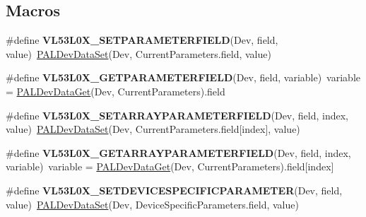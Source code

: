 \subsection*{Macros}
\begin{DoxyCompactItemize}
\item 
\mbox{\label{group__VL53L0X__define__GeneralMacro__group_gaf05e77eb0d359a32ee6c83172b3da513}} 
\#define {\bfseries V\+L53\+L0\+X\+\_\+\+S\+E\+T\+P\+A\+R\+A\+M\+E\+T\+E\+R\+F\+I\+E\+LD}(Dev,  field,  value)~\hyperlink{group__VL53L0X__platform__group_ga7d67a50d6fbce3ffdb71b4b3f7cbdf39}{P\+A\+L\+Dev\+Data\+Set}(Dev, Current\+Parameters.\+field, value)
\item 
\mbox{\label{group__VL53L0X__define__GeneralMacro__group_ga9b7d953c2ac75a493a51d9e19ab7a33f}} 
\#define {\bfseries V\+L53\+L0\+X\+\_\+\+G\+E\+T\+P\+A\+R\+A\+M\+E\+T\+E\+R\+F\+I\+E\+LD}(Dev,  field,  variable)~variable = \hyperlink{group__VL53L0X__platform__group_ga21f3ef1fbe84f5cf77d989c95f21ad0a}{P\+A\+L\+Dev\+Data\+Get}(Dev, Current\+Parameters).field
\item 
\mbox{\label{group__VL53L0X__define__GeneralMacro__group_ga47598a8e8857a13e300f585ea0106892}} 
\#define {\bfseries V\+L53\+L0\+X\+\_\+\+S\+E\+T\+A\+R\+R\+A\+Y\+P\+A\+R\+A\+M\+E\+T\+E\+R\+F\+I\+E\+LD}(Dev,  field,  index,  value)~\hyperlink{group__VL53L0X__platform__group_ga7d67a50d6fbce3ffdb71b4b3f7cbdf39}{P\+A\+L\+Dev\+Data\+Set}(Dev, Current\+Parameters.\+field\mbox{[}index\mbox{]}, value)
\item 
\mbox{\label{group__VL53L0X__define__GeneralMacro__group_gaabf50682bc638f1b109333cedbab6bbf}} 
\#define {\bfseries V\+L53\+L0\+X\+\_\+\+G\+E\+T\+A\+R\+R\+A\+Y\+P\+A\+R\+A\+M\+E\+T\+E\+R\+F\+I\+E\+LD}(Dev,  field,  index,  variable)~variable = \hyperlink{group__VL53L0X__platform__group_ga21f3ef1fbe84f5cf77d989c95f21ad0a}{P\+A\+L\+Dev\+Data\+Get}(Dev, Current\+Parameters).field\mbox{[}index\mbox{]}
\item 
\mbox{\label{group__VL53L0X__define__GeneralMacro__group_gaf99327f12679ada115435e413110eb10}} 
\#define {\bfseries V\+L53\+L0\+X\+\_\+\+S\+E\+T\+D\+E\+V\+I\+C\+E\+S\+P\+E\+C\+I\+F\+I\+C\+P\+A\+R\+A\+M\+E\+T\+ER}(Dev,  field,  value)~\hyperlink{group__VL53L0X__platform__group_ga7d67a50d6fbce3ffdb71b4b3f7cbdf39}{P\+A\+L\+Dev\+Data\+Set}(Dev, Device\+Specific\+Parameters.\+field, value)

\end{DoxyCompactItemize}
